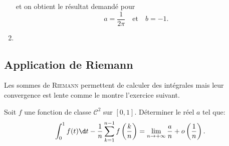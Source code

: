 \begin{solution}
\begin{enumerate}
\[\]
et on obtient le résultat demandé pour 
\[
a = \frac{1}{2 \pi} \quad \text{et} \quad b = -1.
\]
\item 
\end{enumerate}
\end{solution}

\subsection{Application de Riemann}

Les sommes de \textsc{Riemann} permettent de calculer des intégrales mais leur convergence est lente comme le montre l'exercice suivant.

\begin{exercice}
    Soit $f$ une fonction de classe $\mathscr{C}^2$ sur $[0, 1]$. Déterminer le réel $a$ tel que:
    $$\int_0^1 f(t) \d t - \frac{1}{n} \sum_{k=1}^{n-1} f \left( \frac{k}{n} \right) =\lim\limits_{n \to + \infty} \frac{a}{n} + o \left( \frac{1}{n} \right).$$
    \end{exercice}

